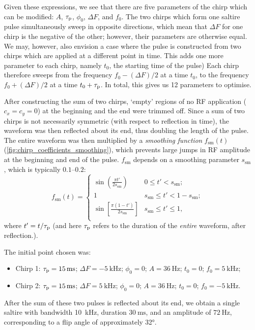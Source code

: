 Given these expressions, we see that there are five parameters of the chirp which can be modified: $A$, $\tau_\mathrm{p}$, $\phi_0$, $\Delta F$, and $f_0$.
The two chirps which form one saltire pulse simultaneously sweep in opposite directions, which mean that $\Delta F$ for one chirp is the negative of the other; however, their parameters are otherwise equal.
We may, however, also envision a case where the pulse is constructed from two chirps which are applied at a different point in time.
This adds one more parameter to each chirp, namely $t_0$, the starting time of the pulse)
Each chirp therefore sweeps from the frequency $f_0 - (\Delta F)/2$ at a time $t_0$, to the frequency $f_0 + (\Delta F)/2$ at a time $t_0 + \tau_\mathrm{p}$.
In total, this gives us 12 parameters to optimise.

After constructing the sum of two chirps, `empty' regions of no RF application ($c_x = c_y = 0$) at the beginning and the end were trimmed off.
Since a sum of two chirps is not necessarily symmetric (with respect to reflection in time), the waveform was then reflected about its end, thus doubling the length of the pulse.
The entire waveform was then multiplied by a \textit{smoothing function} $f_\text{sm}(t)$ (\cref{fig:chirp_coefficients_smoothing}), which prevents large jumps in RF amplitude at the beginning and end of the pulse.
$f_\text{sm}$ depends on a smoothing parameter $s_\text{sm}$, which is typically $0.1$--$0.2$:
\begin{equation}
    \label{eq:sming_function}
    f_\text{sm}(t) = \begin{cases}
        \displaystyle \sin\left(\frac{\pi t'}{2 s_\text{sm}}\right) & 0 \leq t' < s_\text{sm}; \\
        \displaystyle 1 & s_\text{sm} \leq t' < 1 - s_\text{sm}; \\
        \displaystyle \sin\left[\frac{\pi (1 - t')}{2 s_\text{sm}}\right] & s_\text{sm} \leq t' \leq 1, \\
    \end{cases}
\end{equation}
where $t' = t/\tau_\mathrm{p}$ (and here $\tau_\mathrm{p}$ refers to the duration of the \textit{entire} waveform, after reflection.).

The initial point chosen was:
\begin{itemize}
    \item Chirp 1: $\taup = \SI{15}{\ms}$; $\Delta F = \SI{-5}{\kHz}$; $\phi_0 = 0$; $A = \SI{36}{\Hz}$; $t_0 = 0$; $f_0 = \SI{5}{\kHz}$;
    \item Chirp 2: $\taup = \SI{15}{\ms}$; $\Delta F = \SI{5}{\kHz}$; $\phi_0 = 0$; $A = \SI{36}{\Hz}$; $t_0 = 0$; $f_0 = \SI{-5}{\kHz}$.
\end{itemize}
After the sum of these two pulses is reflected about its end, we obtain a single saltire with bandwidth \SI{10}{\kHz}, duration $\SI{30}{\ms}$, and an amplitude of $\SI{72}{\Hz}$, corresponding to a flip angle of approximately \ang{32}.

